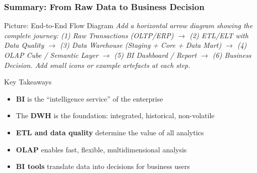 \begin{frame}
  \frametitle{Summary: From Raw Data to Business Decision}

  \begin{alertblock}{Picture: End-to-End Flow Diagram}
    \textit{Add a horizontal arrow diagram showing the complete journey:
    (1) Raw Transactions (OLTP/ERP)
    $\to$ (2) ETL/ELT with Data Quality
    $\to$ (3) Data Warehouse (Staging + Core + Data Mart)
    $\to$ (4) OLAP Cube / Semantic Layer
    $\to$ (5) BI Dashboard / Report
    $\to$ (6) Business Decision.
    Add small icons or example artefacts at each step.}
  \end{alertblock}

  \begin{block}{Key Takeaways}
    \begin{itemize}
      \item \textbf{BI} is the ``intelligence service'' of the enterprise
      \item The \textbf{DWH} is the foundation: integrated, historical, non-volatile
      \item \textbf{ETL and data quality} determine the value of all analytics
      \item \textbf{OLAP} enables fast, flexible, multidimensional analysis
      \item \textbf{BI tools} translate data into decisions for business users
    \end{itemize}
  \end{block}
\end{frame}
